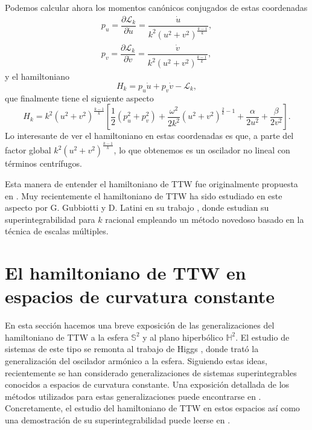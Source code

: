 \documentclass[11pt,a4paper,twoside]{article}
\theoremstyle{definition} \newtheorem{defn}[thm]{Definición}
\theoremstyle{definition} \newtheorem{ejemplo}[thm]{Ejemplo}
\theoremstyle{definition} \newtheorem{ejercicio}[thm]{Ejercicio}
\theoremstyle{remark} \newtheorem*{obs}{Observación}
\begin{document}
Podemos calcular ahora los momentos canónicos conjugados de estas coordenadas
\begin{align}
    p_u=\dfrac{\partial \mathcal{L} _k}{\partial \dot{u}}=\dfrac{\dot{u}}{k^2 (u^2+v^2)^{\frac{k-1}{k}}}, \\
    p_v=\dfrac{\partial \mathcal{L} _k}{\partial \dot{v}}=\dfrac{\dot{v}}{k^2 (u^2+v^2)^{\frac{k-1}{k}}},
\end{align}
y el hamiltoniano
\begin{equation*}
  H_k=p_u \dot{u} + p_v \dot{v} - \mathcal{L}_k,
\end{equation*}
que finalmente tiene el siguiente aspecto
\begin{equation}\label{nuevottw}
  H_k = k^2 (u^2+v^2)^{\frac{k-1}{k}}\left[ \frac{1}{2}(p_u^2+p_v^2)+ \frac{\omega^2}{2k^2}(u^2+v^2)^{\frac{2}{k}-1}+\frac{\alpha}{2u^2}+\frac{\beta}{2 v^2} \right]. 
\end{equation}
Lo interesante de ver el hamiltoniano en estas coordenadas es que, a parte del factor global $k^2(u^2+v^2)^{\frac{k-1}{k}}$, lo que obtenemos es un oscilador no lineal con términos centrífugos.

Esta manera de entender el hamiltoniano de TTW fue originalmente propuesta en \cite{burgos}. Muy recientemente el hamiltoniano de TTW ha sido estudiado en este aspecto por G. Gubbiotti y D. Latini en su trabajo \cite{gubbiottilatini}, donde estudian su superintegrabilidad para $k$ racional empleando un método novedoso basado en la técnica de escalas múltiples.

\section{El hamiltoniano de TTW en espacios de curvatura constante}\label{curvo}
En esta sección hacemos una breve exposición de las generalizaciones del hamiltoniano de TTW a la esfera $\mathbb{S} ^2$ y al plano hiperbólico $\mathbb{H} ^2.$ El estudio de sistemas de este tipo se remonta al trabajo de Higgs \cite{higgs}, donde trató la generalización del oscilador armónico a la esfera. Siguiendo estas ideas, recientemente se han considerado generalizaciones de sistemas superintegrables conocidos a espacios de curvatura constante. Una exposición detallada de los métodos utilizados para estas generalizaciones puede encontrarse en \cite{ballesteros}. Concretamente, el estudio del hamiltoniano de TTW en estos espacios así como una demostración de su superintegrabilidad puede leerse en \cite{ranada}.
\end{document}
